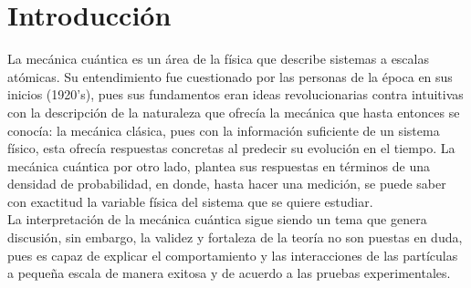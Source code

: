 \chapter{Introducción}\label{ch:introduccion}

La mecánica cuántica es un área de la física que describe sistemas a escalas atómicas. Su entendimiento fue cuestionado por las personas de la época en sus inicios (1920's), pues sus fundamentos eran ideas revolucionarias contra intuitivas con la descripción de la naturaleza que ofrecía la mecánica que hasta entonces se conocía: la mecánica clásica, pues con la información suficiente de un sistema físico, esta ofrecía respuestas concretas al predecir su evolución en el tiempo. La mecánica cuántica por otro lado, plantea sus respuestas en términos de una densidad de probabilidad, en donde, hasta hacer una medición, se puede saber con exactitud la variable física del sistema que se quiere estudiar.
\\
La interpretación de la mecánica cuántica sigue siendo un tema que genera discusión, sin embargo, la validez y fortaleza de la teoría no son puestas en duda, pues es capaz de explicar el comportamiento y las interacciones de las partículas a pequeña escala de manera exitosa y de acuerdo a las pruebas experimentales.
\\


